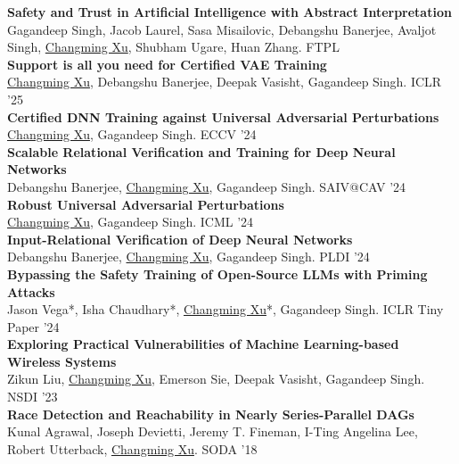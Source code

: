 \documentclass[a4paper,10pt]{article}
\begin{document}
\textbf{Safety and Trust in Artificial Intelligence with Abstract Interpretation}\\
Gagandeep Singh, Jacob Laurel, Sasa Misailovic, Debangshu Banerjee, Avaljot Singh, \underline{Changming Xu}, Shubham Ugare, Huan Zhang. FTPL\\[-8pt]

\textbf{Support is all you need for Certified VAE Training}\\
\underline{Changming Xu}, Debangshu Banerjee, Deepak Vasisht, Gagandeep Singh. ICLR '25\\[-8pt]

\textbf{Certified DNN Training against Universal Adversarial Perturbations}\\
\underline{Changming Xu}, Gagandeep Singh. ECCV '24\\[-8pt]

\textbf{Scalable Relational Verification and Training for Deep Neural Networks}\\
Debangshu Banerjee, \underline{Changming Xu}, Gagandeep Singh. SAIV@CAV '24\\[-8pt]

\textbf{Robust Universal Adversarial Perturbations}\\
\underline{Changming Xu}, Gagandeep Singh. ICML '24\\[-8pt]

\textbf{Input-Relational Verification of Deep Neural Networks}\\
Debangshu Banerjee, \underline{Changming Xu}, Gagandeep Singh. PLDI '24\\[-8pt]

\textbf{Bypassing the Safety Training of Open-Source LLMs with Priming Attacks}\\
Jason Vega*, Isha Chaudhary*, \underline{Changming Xu}*, Gagandeep Singh. ICLR Tiny Paper '24 \\[-8pt]

\textbf{Exploring Practical Vulnerabilities of Machine Learning-based Wireless Systems}\\
Zikun Liu, \underline{Changming Xu}, Emerson Sie, Deepak Vasisht, Gagandeep Singh. NSDI '23\\[-8pt]

\textbf{Race Detection and Reachability in Nearly Series-Parallel DAGs}\\
Kunal Agrawal, Joseph Devietti, Jeremy T. Fineman, I-Ting Angelina Lee, Robert Utterback, \underline{Changming Xu}. SODA '18\\
\hspace*{6pt}{\footnotesize $^*$equal contribution}%
\end{document}
